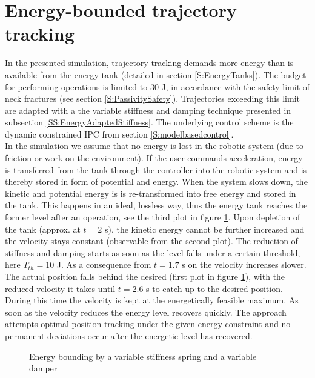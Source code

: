 \documentclass[a4paper,twoside, openright,12pt]{report}
\begin{document}
\section{Energy-bounded trajectory tracking}
In the presented simulation, trajectory tracking demands more energy than is available from the energy tank (detailed in section \ref{S:EnergyTanks}). The budget for performing operations is limited to $30$ J, in accordance with the safety limit of neck fractures (see section \ref{S:PassivitySafety}). Trajectories exceeding this limit are adapted with a the variable stiffness and damping technique presented in subsection \ref{SS:EnergyAdaptedStiffness}. The underlying control scheme is the dynamic constrained IPC from section \ref{S:modelbasedcontrol}.\\
In the simulation we assume that no energy is lost in the robotic system (due to friction or work on the environment). If the user commands acceleration, energy is transferred from the tank through the controller into the robotic system and is thereby stored in form of potential and energy. When the system slows down, the kinetic and potential energy is is re-transformed into free energy and stored in the tank. This happens in an ideal, lossless way, thus the energy tank reaches the former level after an operation, see the third plot in figure \ref{FIG:VarStiff}. Upon depletion of the tank (approx. at $t=2$ s), the kinetic energy cannot be further increased  and the velocity stays constant (observable from the second plot). The reduction of stiffness and damping starts as soon as the level falls under a certain threshold, here $T_{th}=10$ J. As a consequence from $t=1.7$ s on the velocity increases slower. The actual position falls behind the desired (first plot in figure \ref{FIG:VarStiff}), with the reduced velocity it takes until $t=2.6$ s to catch up to the desired position. During this time the velocity is kept at the energetically feasible maximum. As soon as the velocity reduces the energy level recovers quickly. The approach attempts optimal position tracking under the given energy constraint and no permanent deviations occur after the energetic level has recovered.
\begin{figure}

\label{FIG:VarStiff}
\caption[Simulation results of the energy bounding by a variable stiffness spring]{Energy bounding by a variable stiffness spring and a variable damper}
\end{figure}
\end{document}
